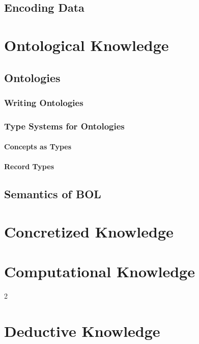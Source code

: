 \documentclass{book}
\begin{document}
\chapter{Encoding Data}\label{sec:wuv:codecs}
  

\part{Ontological Knowledge}\label{sec:wuv:ont}

\chapter{Ontologies}
 
 \section{Writing Ontologies}
   
 \section{Type Systems for Ontologies}
   \subsection{Concepts as Types}
   \subsection{Record Types}
 
\chapter{Semantics of BOL}
 

\part{Concretized Knowledge}\label{sec:wuv:concr}

\part{Computational Knowledge}\label{sec:wuv:comp}2

\part{Deductive Knowledge}\label{sec:wuv:ded}
\end{document}
